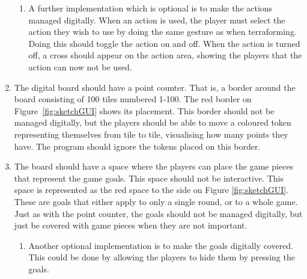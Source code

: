 \begin{enumerate}
	\begin{enumerate}
	\item A further implementation which is optional is to make the actions managed digitally. When an action is used, the player must select the action they wish to use by doing the same gesture as when terraforming. Doing this should toggle the action on and off. When the action is turned off, a cross should appear on the action area, showing the players that the action can now not be used.
	\end{enumerate}
\item The digital board should have a point counter. That is, a border around the board consisting of 100 tiles numbered 1-100. The red border on Figure~\ref{fig:sketchGUI} shows its placement. This border should not be managed digitally, but the players should be able to move a coloured token representing themselves from tile to tile, visualising how many points they have. The program should ignore the tokens placed on this border.
\item The board should have a space where the players can place the game pieces that represent the game goals. This space should not be interactive. This space is represented as the red space to the side on Figure \ref{fig:sketchGUI}. These are goals that either apply to only a single round, or to a whole game. Just as with the point counter, the goals should not be managed digitally, but just be covered with game pieces when they are not important.
	\begin{enumerate}
	\item Another optional implementation is to make the goals digitally covered. This could be done by allowing the players to hide them by pressing the goals.
	\end{enumerate}
\end{enumerate}
